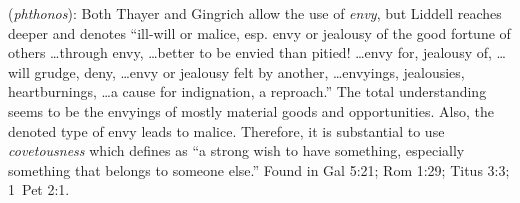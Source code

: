 \item[Covetousness,]

(\textit{phthonos}):
Both Thayer and Gingrich allow the use of \emph{envy}, but Liddell reaches deeper and denotes ``ill-will or malice, esp. envy or jealousy of the good fortune of others \ldots through envy, \ldots better to be envied than pitied! \ldots envy for, jealousy of, \ldots will grudge, deny, \ldots envy or jealousy felt by another, \ldots envyings, jealousies, heartburnings, \ldots a cause for indignation, a reproach.'' The total understanding seems to be the envyings of mostly material goods and opportunities. Also, the denoted type of envy leads to malice. Therefore, it is substantial to use \emph{covetousness} which defines as ``a strong wish to have something, especially something that belongs to someone else.''
Found in Gal 5:21; Rom 1:29; Titus 3:3; 1~Pet 2:1.
